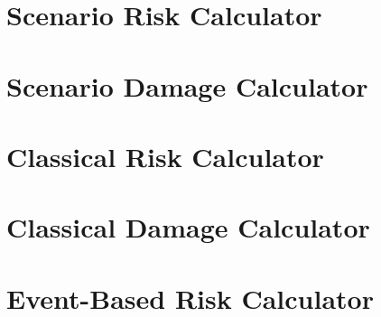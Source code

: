 \section{Scenario Risk Calculator}
   \label{sec:acc-sr}
   
\section{Scenario Damage Calculator}
   \label{sec:acc-sd}
   
\section{Classical Risk Calculator}
   \label{sec:acc-cr}
   
\section{Classical Damage Calculator}
   \label{sec:acc-cd}
   
\section{Event-Based Risk Calculator}
   \label{sec:acc-ebr}
   
   \cleardoublepage